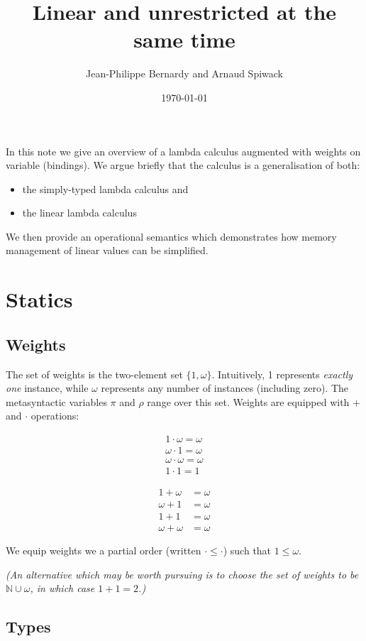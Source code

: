 \documentclass[11pt]{article}
\author{Jean-Philippe Bernardy and Arnaud Spiwack}
\date{\today}
\title{Linear and unrestricted at the same time}
\begin{document}
\maketitle
\tableofcontents

In this note we give an overview of a lambda calculus augmented with
weights on variable (bindings). We argue briefly that the calculus is
a generalisation of both:
\begin{itemize}
\item the simply-typed lambda calculus and
\item the linear lambda calculus
\end{itemize}

We then provide an operational semantics which demonstrates how memory
management of linear values can be simplified.

\section{Statics}
\label{sec:orgheadline8}
\subsection{Weights}
\label{sec:orgheadline1}

The set of weights is the two-element set $\{1,ω\}$. Intuitively, 1
represents \emph{exactly one} instance, while $ω$ represents any number of
instances (including zero).  The metasyntactic variables \(π\) and \(ρ\)
range over this set. Weights are equipped with + and $·$ operations:


\begin{align*}
1 · ω = ω \\
ω · 1 = ω \\
ω · ω = ω \\
1 · 1 = 1
\end{align*}

\begin{align*}
1 + ω &= ω \\
ω + 1 &= ω \\
1 + 1 &= ω \\
ω + ω &= ω
\end{align*}

We equip weights we a partial order (written \(· ≤ ·\)) such that \(1 ≤ ω\).

\emph{(An alternative which may be worth pursuing is to choose the set of
weights to be \(ℕ∪{ω}\), in which case \(1+1=2\).)}

\subsection{Types}
\label{sec:orgheadline2}
\end{document}
